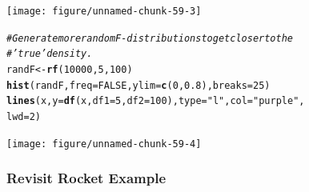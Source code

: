 \documentclass[oneside]{book}\usepackage[]{graphicx}\usepackage[dvipsnames,table,xcdraw]{xcolor}
\makeatletter
\newcommand{\hlnum}[1]{\textcolor[rgb]{0.686,0.059,0.569}{#1}}%
\newcommand{\hlstr}[1]{\textcolor[rgb]{0.192,0.494,0.8}{#1}}%
\newcommand{\hlcom}[1]{\textcolor[rgb]{0.678,0.584,0.686}{\textit{#1}}}%
\newcommand{\hlstd}[1]{\textcolor[rgb]{0.345,0.345,0.345}{#1}}%
\newcommand{\hlkwb}[1]{\textcolor[rgb]{0.69,0.353,0.396}{#1}}%
\newcommand{\hlkwc}[1]{\textcolor[rgb]{0.333,0.667,0.333}{#1}}%
\newcommand{\hlkwd}[1]{\textcolor[rgb]{0.737,0.353,0.396}{\textbf{#1}}}%
\newenvironment{kframe}{%
 \def\at@end@of@kframe{}%
 \ifinner\ifhmode%
  \def\at@end@of@kframe{\end{minipage}}%
  \begin{minipage}{\columnwidth}%
 \fi\fi%
 \def\FrameCommand##1{\hskip\@totalleftmargin \hskip-\fboxsep
 \colorbox{shadecolor}{##1}\hskip-\fboxsep
     \hskip-\linewidth \hskip-\@totalleftmargin \hskip\columnwidth}%
 \MakeFramed {\advance\hsize-\width
   \@totalleftmargin\z@ \linewidth\hsize
   \@setminipage}}%
 {\par\unskip\endMakeFramed%
 \at@end@of@kframe}
\newenvironment{knitrout}{}{} %
\makeatother
\begin{document}
\begin{knitrout}
{\centering \texttt{[image: figure/unnamed-chunk-59-3]} 

}


\begin{kframe}\begin{alltt}
\hlcom{# Generate more random F-distributions to get closer to the}
\hlcom{# 'true' density.}
\hlstd{randF} \hlkwb{<-} \hlkwd{rf}\hlstd{(}\hlnum{10000}\hlstd{,} \hlnum{5}\hlstd{,} \hlnum{100}\hlstd{)}
\hlkwd{hist}\hlstd{(randF,} \hlkwc{freq} \hlstd{=} \hlnum{FALSE}\hlstd{,} \hlkwc{ylim} \hlstd{=} \hlkwd{c}\hlstd{(}\hlnum{0}\hlstd{,} \hlnum{0.8}\hlstd{),} \hlkwc{breaks} \hlstd{=} \hlnum{25}\hlstd{)}
\hlkwd{lines}\hlstd{(x,} \hlkwc{y} \hlstd{=} \hlkwd{df}\hlstd{(x,} \hlkwc{df1} \hlstd{=} \hlnum{5}\hlstd{,} \hlkwc{df2} \hlstd{=} \hlnum{100}\hlstd{),} \hlkwc{type} \hlstd{=} \hlstr{"l"}\hlstd{,} \hlkwc{col} \hlstd{=} \hlstr{"purple"}\hlstd{,}
  \hlkwc{lwd} \hlstd{=} \hlnum{2}\hlstd{)}
\end{alltt}
\end{kframe}

{\centering \texttt{[image: figure/unnamed-chunk-59-4]} 

}


\end{knitrout}

\subsubsection{Revisit Rocket Example}
\end{document}
